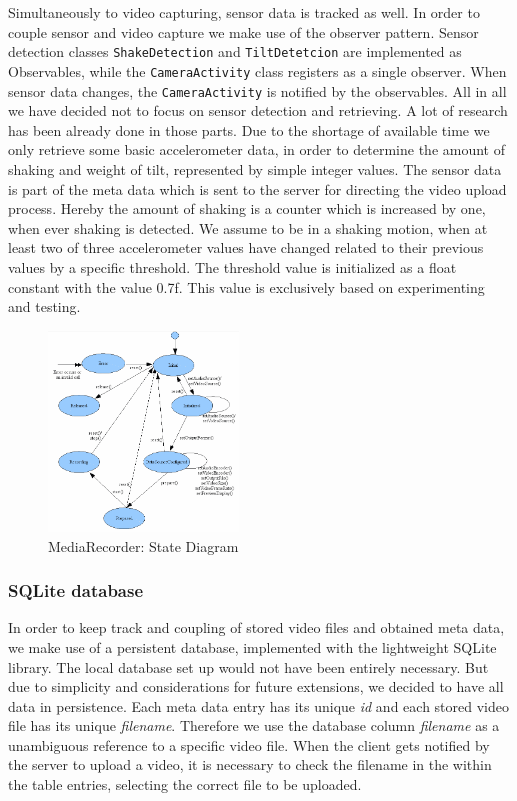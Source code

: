 \documentclass[conference]{IEEEtran}
\begin{document}
Simultaneously to video capturing, sensor data is tracked as well.
In order to couple sensor and video capture we make use of the observer pattern.
Sensor detection classes \texttt{ShakeDetection} and \texttt{TiltDetetcion} are implemented as Observables,
while the \texttt{CameraActivity} class registers as a single observer. 
When sensor data changes, the \texttt{CameraActivity} is notified by the observables.
All in all we have decided not to focus on sensor detection and retrieving.
A lot of research has been already done in those parts. Due to the shortage of available time we only retrieve 
some basic accelerometer data, in order to determine the amount of shaking and weight of tilt, 
represented by simple integer values.
The sensor data is part of the meta data which is sent to the server for directing the video upload process.
Hereby the amount of shaking is a counter which is increased by one, when ever shaking is detected.
We assume to be in a shaking motion, when at least two of three accelerometer values have changed related
to their previous values by a specific threshold.
The threshold value is initialized as a float constant with the value 0.7f. This value is exclusively based on experimenting and testing.

\begin{figure}[!t]
	\centering
	\includegraphics[width=0.45\textwidth]{mediarecorder.jpg}
	\caption{MediaRecorder: State Diagram}
	\label{fig:mediarecorder}
\end{figure}

\subsubsection{SQLite database}
In order to keep track and coupling of stored video files and obtained meta data, we make use of a persistent database,
implemented with the lightweight SQLite library.
The local database set up would not have been entirely necessary. 
But due to simplicity and considerations for future extensions, we decided to have all data in persistence.
Each meta data entry has its unique \textsl{id} and each stored video file has its unique \textsl{filename}.
Therefore we use the database column \textsl{filename} as a unambiguous reference to a specific video file.
When the client gets notified by the server to upload a video, it is necessary to check the filename in the within 
the table entries, selecting the correct file to be uploaded.
\end{document}
